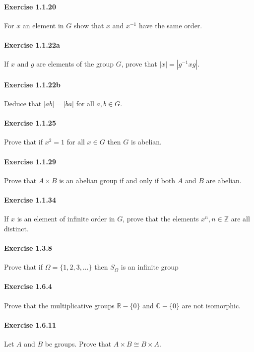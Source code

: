 \documentclass{article}
\begin{document}
\paragraph{Exercise 1.1.20} For $x$ an element in $G$ show that $x$ and $x^{-1}$ have the same order.

\paragraph{Exercise 1.1.22a} If $x$ and $g$ are elements of the group $G$, prove that $|x|=\left|g^{-1} x g\right|$.

\paragraph{Exercise 1.1.22b} Deduce that $|a b|=|b a|$ for all $a, b \in G$.

\paragraph{Exercise 1.1.25} Prove that if $x^{2}=1$ for all $x \in G$ then $G$ is abelian.

\paragraph{Exercise 1.1.29} Prove that $A \times B$ is an abelian group if and only if both $A$ and $B$ are abelian.

\paragraph{Exercise 1.1.34} If $x$ is an element of infinite order in $G$, prove that the elements $x^{n}, n \in \mathbb{Z}$ are all distinct.

\paragraph{Exercise 1.3.8} Prove that if $\Omega=\{1,2,3, \ldots\}$ then $S_{\Omega}$ is an infinite group

\paragraph{Exercise 1.6.4} Prove that the multiplicative groups $\mathbb{R}-\{0\}$ and $\mathbb{C}-\{0\}$ are not isomorphic.

\paragraph{Exercise 1.6.11} Let $A$ and $B$ be groups. Prove that $A \times B \cong B \times A$.
\end{document}
